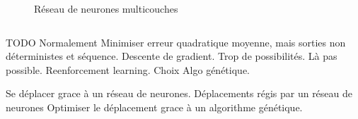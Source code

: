 \documentclass[10pt]{beamer}
\begin{document}
\begin{frame}
\begin{columns}[T]
\begin{column}{0.4\textwidth}
\begin{figure}
{
}
\caption*{\tiny Réseau de neurones multicouches}
\end{figure}
\end{column}
\end{columns}
\end{frame}

\begin{frame}
TODO
Normalement Minimiser erreur quadratique moyenne, mais sorties non déterministes et séquence.
Descente de gradient.
Trop de possibilités.
Là pas possible.
Reenforcement learning.
Choix Algo génétique.

Se déplacer grace à un réseau de neurones.
Déplacements régis par un réseau de neurones
Optimiser le déplacement grace à un algorithme génétique.
\end{frame}
\end{document}

